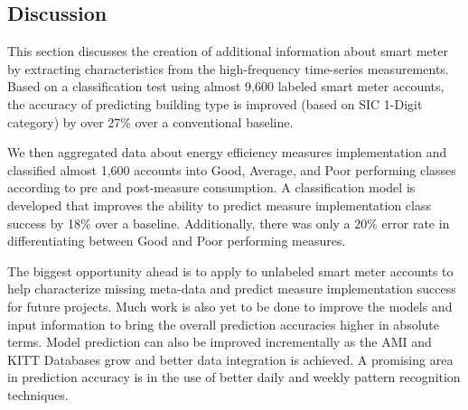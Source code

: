 \subsection{Discussion}
\label{sec:scalabilitydiscussion}

This section discusses the creation of additional information about smart meter by extracting characteristics from the high-frequency time-series measurements. Based on a classification test using almost 9,600 labeled smart meter accounts, the accuracy of predicting building type is improved (based on SIC 1-Digit category) by over 27\% over a conventional baseline. 

We then aggregated data about energy efficiency measures implementation and classified almost 1,600 accounts into Good, Average, and Poor performing classes according to pre and post-measure consumption. A classification model is developed that improves the ability to predict measure implementation class success by 18\% over a baseline. Additionally, there was only a 20\% error rate in differentiating between Good and Poor performing measures.

The biggest opportunity ahead is to apply to unlabeled smart meter accounts to help characterize missing meta-data and predict measure implementation success for future projects. Much work is also yet to be done to improve the models and input information to bring the overall prediction accuracies higher in absolute terms. Model prediction can also be improved incrementally as the AMI and KITT Databases grow and better data integration is achieved. A promising area in prediction accuracy is in the use of better daily and weekly pattern recognition techniques.
